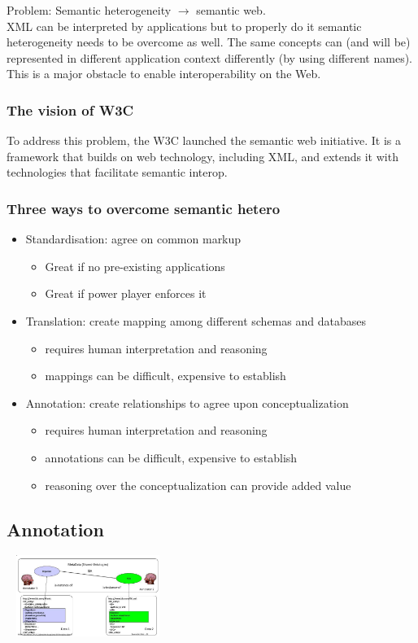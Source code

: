 Problem: Semantic heterogeneity $ \rightarrow $ semantic web. \\
XML can be interpreted by applications but to properly do it semantic
heterogeneity needs to be overcome as well. The same concepts can (and
will be) represented in different application context differently (by
using different names). This is a major obstacle to enable
interoperability on the Web.

\subsubsection{The vision of W3C}
To address this problem, the W3C launched the semantic web
initiative. It is a framework that builds on web technology, including
XML, and extends it with technologies that facilitate semantic
interop.

\subsubsection{Three ways to overcome semantic hetero}
\begin{itemize}
\item Standardisation: agree on common markup
  \begin{itemize}
  \item Great if no pre-existing applications
  \item Great if power player enforces it
  \end{itemize}
\item Translation: create mapping among different schemas and
  databases
  \begin{itemize}
  \item requires human interpretation and reasoning
  \item mappings can be difficult, expensive to establish
  \end{itemize}
\item Annotation: create relationships to agree upon conceptualization
  \begin{itemize}
  \item requires human interpretation and reasoning
  \item annotations can be difficult, expensive to establish
  \item reasoning over the conceptualization can provide added value
  \end{itemize}
\end{itemize}

\subsection{Annotation}
\includegraphics[width=200px, height=100px]{annot}

